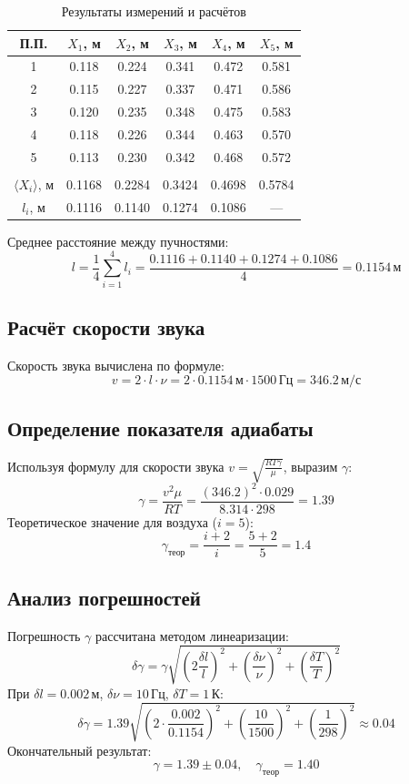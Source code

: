 \documentclass[a4paper]{article}
\begin{document}
\begin{table}[h!]
\centering
\caption{Результаты измерений и расчётов}
\begin{tabular}{|c|c|c|c|c|c|}
\hline
П.П. & \( X_1 \), м & \( X_2 \), м & \( X_3 \), м & \( X_4 \), м & \( X_5 \), м \\ \hline
1 & 0.118 & 0.224 & 0.341 & 0.472 & 0.581 \\ \hline
2 & 0.115 & 0.227 & 0.337 & 0.471 & 0.586 \\ \hline
3 & 0.120 & 0.235 & 0.348 & 0.475 & 0.583 \\ \hline
4 & 0.118 & 0.226 & 0.344 & 0.463 & 0.570 \\ \hline
5 & 0.113 & 0.230 & 0.342 & 0.468 & 0.572 \\ \hline
\multicolumn{6}{c}{} \\[-0.5em]
\hline
\( \langle X_i \rangle \), м & 0.1168 & 0.2284 & 0.3424 & 0.4698 & 0.5784 \\ \hline
\( l_i \), м & 0.1116 & 0.1140 & 0.1274 & 0.1086 & — \\ \hline
\end{tabular}
\end{table}

Среднее расстояние между пучностями:
\[
l = \frac{1}{4} \sum_{i=1}^4 l_i = \frac{0.1116 + 0.1140 + 0.1274 + 0.1086}{4} = 0.1154 \, \text{м}
\]

\subsection{Расчёт скорости звука}
Скорость звука вычислена по формуле:
\[
v = 2 \cdot l \cdot \nu = 2 \cdot 0.1154 \, \text{м} \cdot 1500 \, \text{Гц} = 346.2 \, \text{м/с}
\]

\subsection{Определение показателя адиабаты}
Используя формулу для скорости звука \( v = \sqrt{\frac{R T \gamma}{\mu}} \), выразим \( \gamma \):
\[
\gamma = \frac{v^2 \mu}{R T} = \frac{(346.2)^2 \cdot 0.029}{8.314 \cdot 298} = 1.39
\]
Теоретическое значение для воздуха (\( i = 5 \)):
\[
\gamma_{\text{теор}} = \frac{i + 2}{i} = \frac{5 + 2}{5} = 1.4
\]

\subsection{Анализ погрешностей}
Погрешность \( \gamma \) рассчитана методом линеаризации:
\[
\delta \gamma = \gamma \sqrt{\left(2 \frac{\delta l}{l}\right)^2 + \left(\frac{\delta \nu}{\nu}\right)^2 + \left(\frac{\delta T}{T}\right)^2}
\]
При \( \delta l = 0.002 \, \text{м} \), \( \delta \nu = 10 \, \text{Гц} \), \( \delta T = 1 \, \text{К} \):
\[
\delta \gamma = 1.39 \sqrt{\left(2 \cdot \frac{0.002}{0.1154}\right)^2 + \left(\frac{10}{1500}\right)^2 + \left(\frac{1}{298}\right)^2} \approx 0.04
\]
Окончательный результат:
\[
\gamma = 1.39 \pm 0.04, \quad \gamma_{\text{теор}} = 1.40
\]
\end{document}
